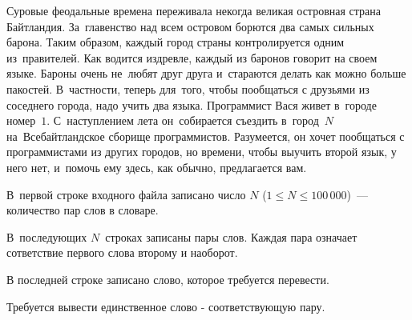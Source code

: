 
Суровые феодальные времена переживала некогда великая островная страна
Байтландия. За~главенство над всем островом борются два самых сильных барона.
Таким образом, каждый город страны контролируется одним из~правителей. Как
водится издревле, каждый из баронов говорит на своем языке. Бароны очень
не~любят друг друга и~стараются делать как можно больше пакостей. В~частности,
теперь для~того, чтобы пообщаться с друзьями из соседнего города, надо учить два
языка. Программист Вася живет в~городе номер~$1$. С~наступлением лета
он~собирается съездить в~город~$N$ на~Всебайтландское сборище программистов.
Разумеется, он хочет пообщаться с программистами из других городов, но  времени,
чтобы выучить второй язык, у него нет, и~помочь ему здесь, как обычно, предлагается вам.


\InputFile
В~первой строке входного файла записано число $N$ ($1 \leqslant N \leqslant
100\,000$)~--- количество пар слов в словаре.

В~последующих $N$~строках записаны пары слов. Каждая пара означает сответствие
первого слова второму и наоборот.

В последней строке записано слово, которое требуется перевести.

\OutputFile
Требуется вывести единственное слово - соответствующую пару.
